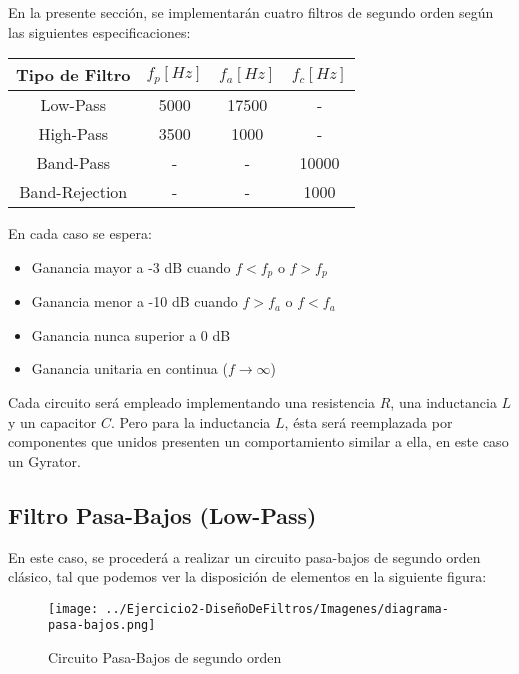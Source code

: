 En la presente sección, se implementarán cuatro filtros de segundo orden según las siguientes especificaciones:

\begin{table}[H]
    \centering
    \begin{tabular}{|c|c|c|c|}
    \hline
    \rowcolor[HTML]{C0C0C0} 
    Tipo de Filtro & $f_p[Hz]$ & $f_a[Hz]$ & $f_c[Hz]$ \\ \hline
    Low-Pass       & 5000   & 17500  & -      \\ \hline
    High-Pass      & 3500   & 1000   & -      \\ \hline
    Band-Pass      & -      & -      & 10000  \\ \hline
    Band-Rejection & -      & -      & 1000   \\ \hline
    \end{tabular}
    \end{table}

En cada caso se espera:

\begin{itemize}
	\item Ganancia mayor a -3 dB cuando $f < f_p$ o $f > f_p$ 
	\item Ganancia menor a -10 dB cuando $f > f_a$ o $f < f_a$
	\item Ganancia nunca superior a 0 dB
	\item Ganancia unitaria en continua ($f \to \infty$)
\end{itemize}

Cada circuito será empleado implementando una resistencia $R$, una inductancia $L$ y un capacitor $C$. Pero para la
inductancia $L$, ésta será reemplazada por componentes que unidos presenten un comportamiento similar a ella, en este caso
un Gyrator.

\subsection{Filtro Pasa-Bajos (Low-Pass)}

En este caso, se procederá a realizar un circuito pasa-bajos de segundo orden clásico, tal que podemos
ver la disposición de elementos en la siguiente figura:

\begin{figure}[H]
    \centering
    \texttt{[image: ../Ejercicio2-DiseñoDeFiltros/Imagenes/diagrama-pasa-bajos.png]}
    \caption{Circuito Pasa-Bajos de segundo orden}
\end{figure}

